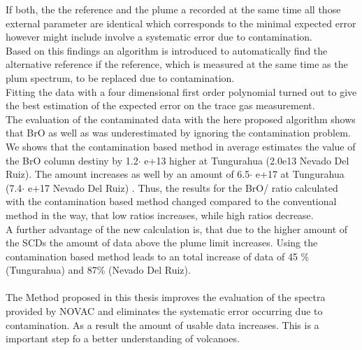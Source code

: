 \documentclass  [
  paper    = a4,
  BCOR     = 10mm,
  twoside,
  fontsize = 12pt,
  fleqn,
  toc      = bibnumbered,
  toc      = listofnumbered,
  numbers  = noendperiod,
  headings = normal,
  listof   = leveldown,
  version  = 3.03
]                                       {scrreprt}
\begin{document}
	If both, the the reference and the plume a recorded at the same time all those external parameter are  identical which corresponds to the minimal expected error however might include involve a systematic error due to contamination.\\
	Based on this findings an algorithm is introduced to automatically find the alternative reference if the reference, which is measured at the same time as the plum spectrum, to be replaced due to contamination.\\
	Fitting the data with a four dimensional first order polynomial turned out to give the best estimation of the expected error on the trace gas measurement.\\
	The evaluation of the contaminated data with the here proposed algorithm shows that BrO as well as  was underestimated by ignoring the contamination problem.
	We shows that the contamination based method in average estimates the value of the BrO column destiny by 1.2$\cdot$ e+13 higher at Tungurahua (2.0e13 Nevado Del Ruiz). The  amount increases as well by an amount of 6.5$\cdot$ e+17 at Tungurahua (7.4$\cdot$ e+17 Nevado Del Ruiz) . Thus, the results for the BrO/ ratio calculated with the contamination based method changed compared to the conventional method in the way, that low ratios increases, while high ratios decrease.\\
	A further advantage of the new calculation is, that due to the higher amount of the  SCDs the amount of data above the plume limit increases. Using the contamination based method leads to an total increase of data of 45 \% (Tungurahua) and 87\% (Nevado Del Ruiz).\\
	\\
	The Method proposed in this thesis improves the evaluation of the spectra provided by NOVAC and eliminates the systematic error occurring due to contamination. As a result the amount of usable data increases. This is a important step fo a better understanding of volcanoes.


	
	
	
\end{document}
